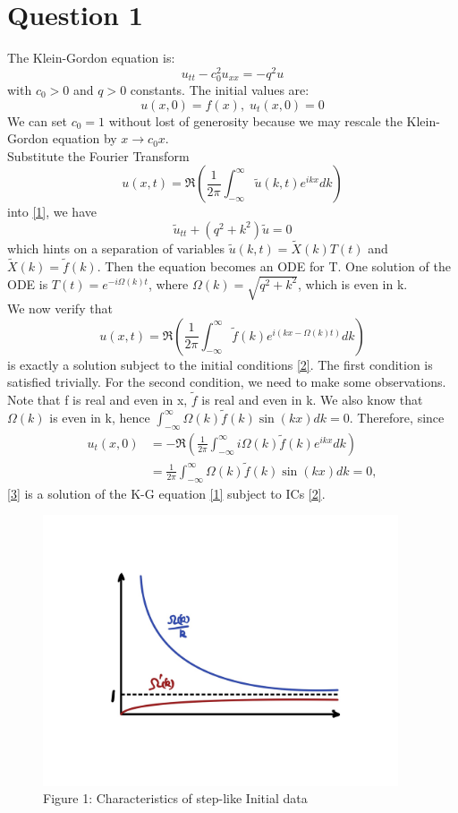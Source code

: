 \documentclass[a4paper,11pt]{article}
\begin{document}
\section{Question 1}
The Klein-Gordon equation is:
\begin{equation}
u_{tt} - c_0^2 u_{xx} = -q^2 u
\label{1}
\end{equation}
with $c_0 > 0$ and $q > 0$ constants.
The initial values are: 
\begin{equation}
u(x,0) = f(x),\; u_t (x,0) = 0
\label{2}
\end{equation}
We can set $c_{0} = 1$ without lost of generosity because we may rescale the Klein-Gordon equation by $x \to c_0x$. \\
Substitute the Fourier Transform 
$$
u(x,t) = \Re\left(\frac{1}{2 \pi} \int_{-\infty}^{\infty}
\tilde{u}(k,t) e^{ikx} dk \right)
$$
into \ref{1}, we have
$$\tilde{u}_{tt}+(q^2+k^2) \tilde{u} = 0$$
which hints on a separation of variables $\tilde{u}(k,t) = \tilde{X}(k)T(t)$ and $\tilde{X}(k) = \tilde{f}(k)$. Then the equation becomes an ODE for T. One solution of the ODE is $T(t) = e^{-i\Omega(k)t}$, where $\Omega(k) = \sqrt{q^2+k^2}$, which is even in k.\\
We now verify that 
\begin{equation}
u(x,t)  = \Re\left(\frac{1}{2\pi} \int_{-\infty}^{\infty} \tilde{f}(k)e^{i(kx-\Omega(k)t)}dk\right)
\label{3}
\end{equation}
is exactly a solution subject to the initial conditions \ref{2}. The first condition is satisfied trivially. For the second condition, we need to make some observations.\\
Note that f is real and even in x, $\tilde{f}$ is real and even in k. We also know that $\Omega(k)$ is even in k, hence $\int_{-\infty}^{\infty} \Omega(k)\tilde{f}(k)\sin(kx)dk  = 0$. 
Therefore, since 
\begin{align*}
u_t (x,0)  &= -\Re\left(\frac{1}{2\pi} \int_{-\infty}^{\infty} i\Omega(k)\tilde{f}(k)e^{ikx}dk\right)\\
&= \frac{1}{2\pi}\int_{-\infty}^{\infty} \Omega(k)\tilde{f}(k)\sin(kx)dk = 0,
\end{align*}
\ref{3} is a solution of the K-G equation \ref{1} subject to ICs \ref{2}.
\begin{figure}[H]
 \center
 \includegraphics[width = 0.9\linewidth, height =8cm]{Q1.jpg}
 \caption{Figure 1: Characteristics of step-like Initial data}
 \label{Q1}
\end{figure}
\end{document}
